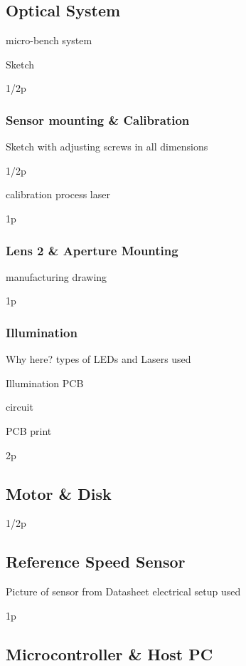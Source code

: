 \documentclass[12pt,a4paper]{article}
\begin{document}
\subsection{Optical System}

micro-bench system

Sketch

1/2p

\subsubsection{Sensor mounting \& Calibration}

Sketch with adjusting screws in all dimensions

1/2p

calibration process
  laser

1p

\subsubsection{Lens 2 \& Aperture Mounting}

manufacturing drawing

1p

\subsubsection{Illumination}

  Why here?
  types of LEDs and Lasers used
 
  Illumination PCB

  circuit

  PCB print

2p

\subsection{Motor \& Disk}

1/2p

\subsection{Reference Speed Sensor}
      Picture of sensor from Datasheet
      electrical setup used

1p

\subsection{Microcontroller \& Host PC}      
\end{document}
